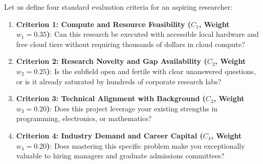Let us define four standard evaluation criteria for an aspiring researcher:
\begin{enumerate}
    \item \textbf{Criterion 1: Compute and Resource Feasibility ($C_1$, Weight $w_1 = 0.35$)}: Can this research be executed with accessible local hardware and free cloud tiers without requiring thousands of dollars in cloud compute?
    \item \textbf{Criterion 2: Research Novelty and Gap Availability ($C_2$, Weight $w_2 = 0.25$)}: Is the subfield open and fertile with clear unanswered questions, or is it already saturated by hundreds of corporate research labs?
    \item \textbf{Criterion 3: Technical Alignment with Background ($C_3$, Weight $w_3 = 0.20$)}: Does this project leverage your existing strengths in programming, electronics, or mathematics?
    \item \textbf{Criterion 4: Industry Demand and Career Capital ($C_4$, Weight $w_4 = 0.20$)}: Does mastering this specific problem make you exceptionally valuable to hiring managers and graduate admissions committees?
\end{enumerate}

